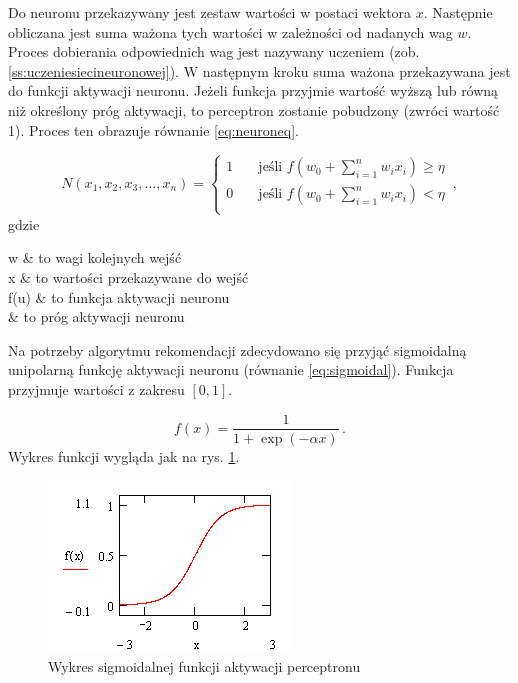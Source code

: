 \documentclass[twoside]{iisthesis}
\begin{document}
	 Do neuronu przekazywany jest zestaw wartości w postaci wektora $x$. Następnie obliczana jest suma ważona tych wartości w zależności od nadanych wag $w$. Proces dobierania odpowiednich wag jest nazywany uczeniem (zob. \ref{ss:uczeniesiecineuronowej}). W następnym kroku suma ważona przekazywana jest do funkcji aktywacji neuronu. Jeżeli funkcja przyjmie wartość wyższą lub równą niż określony próg aktywacji, to perceptron zostanie pobudzony (zwróci wartość 1). Proces ten obrazuje równanie \ref{eq:neuroneq}.
	 
	 \begin{equation}
	 \label{eq:neuroneq}
	 N(x_1, x_2, x_3, \ldots, x_n) = 
	 \begin{cases}
	 1       & \quad \text{jeśli } f(w_0 + \sum_{i=1}^{n}w_ix_i) \geq \eta\\
	 0		 & \quad \text{jeśli } f(w_0 + \sum_{i=1}^{n}w_ix_i) < \eta\\
	 \end{cases}
	 \,,
	 \end{equation}		 
	 gdzie
	 
	 \begin{conditions*}
	 	w & to wagi kolejnych wejść \\
	 	x & to wartości przekazywane do wejść \\
	 	f(u) & to funkcja aktywacji neuronu \\
	 	\eta & to próg aktywacji neuronu
	 \end{conditions*} 
	 
	 Na potrzeby algorytmu rekomendacji zdecydowano się przyjąć sigmoidalną unipolarną funkcję aktywacji neuronu (równanie \ref{eq:sigmoidal}). Funkcja przyjmuje wartości z zakresu $[0,1]$.
	 
	 \begin{equation}
	 \label{eq:sigmoidal}
	 f(x) = \frac{1}{1 + \exp(-\alpha x)}
	 \,.
	 \end{equation}
	 Wykres funkcji wygląda jak na rys. \ref{fig:sigmoid}.
	 
	 \begin{figure}[!ht] 
	 	\centering
	 	\includegraphics{sigmoid}
	 	\caption{Wykres sigmoidalnej funkcji aktywacji perceptronu \protect\cite{aforgenet}}
	 	\label{fig:sigmoid}
	 \end{figure}
	 
\end{document}
